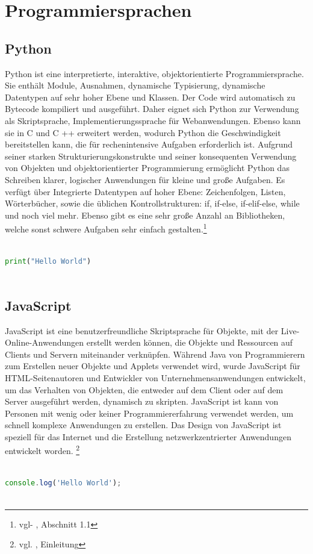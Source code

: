 \newpage

\section{Programmiersprachen}

\subsection{Python}

Python ist eine interpretierte, interaktive, objektorientierte Programmiersprache. Sie enthält Module, Ausnahmen, dynamische Typisierung, dynamische Datentypen auf sehr hoher Ebene und Klassen. Der Code wird automatisch zu Bytecode kompiliert und ausgeführt. Daher eignet sich Python zur Verwendung als Skriptsprache, Implementierungssprache für Webanwendungen. Ebenso kann sie in C und C ++ erweitert werden, wodurch Python die Geschwindigkeit bereitstellen kann, die für rechenintensive Aufgaben erforderlich ist. Aufgrund seiner starken Strukturierungskonstrukte und seiner konsequenten Verwendung von Objekten und objektorientierter Programmierung ermöglicht Python das Schreiben klarer, logischer Anwendungen für kleine und große Aufgaben. Es verfügt über Integrierte Datentypen auf hoher Ebene: Zeichenfolgen, Listen, Wörterbücher, sowie die üblichen Kontrollstrukturen: if, if-else, if-elif-else, while und noch viel mehr. Ebenso gibt es eine sehr große Anzahl an Bibliotheken, welche sonst schwere Aufgaben sehr einfach gestalten.\footnote{vgl- \autocite{python}, Abschnitt 1.1}

\begin{lstlisting}[language=Python, caption={Hello World Programm in Pyhton},captionpos=b]
	
print("Hello World")
	
\end{lstlisting}

\subsection{JavaScript}

JavaScript ist eine benutzerfreundliche Skriptsprache für Objekte, mit der Live-Online-Anwendungen erstellt werden können, die Objekte und Ressourcen auf Clients und Servern miteinander verknüpfen. Während Java von Programmierern zum Erstellen neuer Objekte und Applets verwendet wird, wurde JavaScript für HTML-Seitenautoren und Entwickler von Unternehmensanwendungen entwickelt, um das Verhalten von Objekten, die entweder auf dem Client oder auf dem Server ausgeführt werden, dynamisch zu skripten. JavaScript ist kann von Personen mit wenig oder keiner Programmiererfahrung verwendet werden, um schnell komplexe Anwendungen zu erstellen. Das Design von JavaScript ist speziell für das Internet und die Erstellung netzwerkzentrierter Anwendungen entwickelt worden. \footnote{vgl. \cite{javascript}, Einleitung}

\begin{lstlisting}[language=JavaScript, caption={Hello World Programm in JavaScript},captionpos=b]
	
console.log('Hello World');
	
\end{lstlisting}

\newpage


